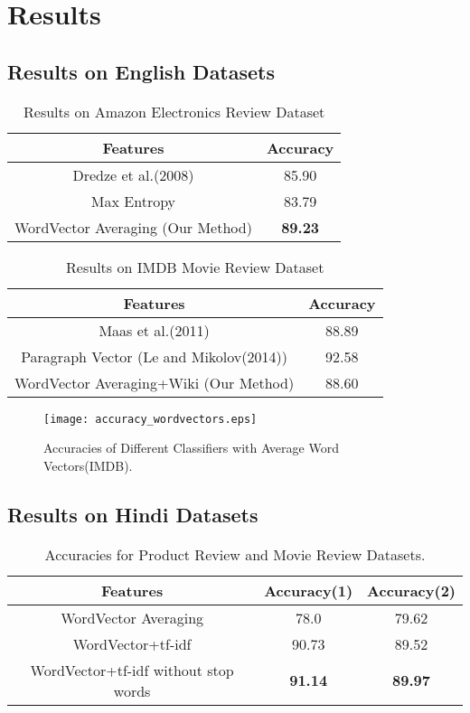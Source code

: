 \chapter{Results}
\section{Results on English Datasets}
\begin {table}[h!]
\centering
\begin{tabular}{ | c | c | }
\hline
\textbf{Features} & \textbf{Accuracy} \\ \hline
Dredze et al.(2008) & 85.90\\ \hline
Max Entropy & 83.79\\ \hline
WordVector Averaging (Our Method) & \textbf{89.23}\\ \hline
\end{tabular}
\caption {Results on Amazon Electronics Review Dataset}
\end{table}

\begin {table}[h!]
\centering
\begin{tabular}{ | c | c | }
\hline
\textbf{Features} & \textbf{Accuracy} \\ \hline
Maas et al.(2011) & 88.89\\ \hline
Paragraph Vector (Le and Mikolov(2014)) & 92.58\\ \hline
WordVector Averaging+Wiki (Our Method) & 88.60\\ \hline
\end{tabular}
\caption {Results on IMDB Movie Review Dataset}
\end{table}


\begin{figure}[ht!]
\centering
\texttt{[image: accuracy\_wordvectors.eps]}
\caption{Accuracies of Different Classifiers with Average Word Vectors(IMDB). \label{fig:accuracy_wordvectors}}
\end{figure}

\section{Results on Hindi Datasets}
\begin {table}[h!]
\centering
\begin{tabular}{ | c | c | c | }
\hline
\textbf{Features} & \textbf{Accuracy(1)} & \textbf{Accuracy(2)} \\ \hline
WordVector Averaging & 78.0 & 79.62\\ \hline
WordVector+tf-idf & 90.73 & 89.52\\ \hline
WordVector+tf-idf without stop words & \textbf{91.14} & \textbf{89.97}\\ \hline
\end{tabular}
\caption {Accuracies for Product Review and Movie Review Datasets.}
\end{table}

